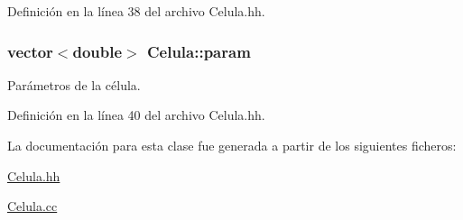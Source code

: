 \-Definición en la línea 38 del archivo \-Celula.\-hh.

\hypertarget{class_celula_a386c6da3af12b5662e3866675d60a4b7}{
\subsubsection[{param}]{\setlength{\rightskip}{0pt plus 5cm}vector$<$double$>$ {\bf \-Celula\-::param}}}\label{class_celula_a386c6da3af12b5662e3866675d60a4b7}


\-Parámetros de la célula. 



\-Definición en la línea 40 del archivo \-Celula.\-hh.



\-La documentación para esta clase fue generada a partir de los siguientes ficheros\-:\begin{DoxyCompactItemize}
\item 
\hyperlink{_celula_8hh}{\-Celula.\-hh}\item 
\hyperlink{_celula_8cc}{\-Celula.\-cc}\end{DoxyCompactItemize}
